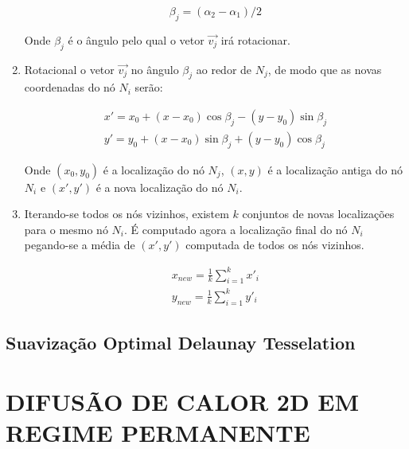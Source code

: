 \begin{enumerate}
    \begin{equation*}
        \beta_j = (\alpha_2 - \alpha_1) / 2
    \end{equation*}

    Onde $\beta_j$ é o ângulo pelo qual o vetor $\vec{v_j}$ irá rotacionar.

    \item Rotacional o vetor $\vec{v_j}$ no ângulo $\beta_j$ ao redor de $N_j$, de modo que as novas coordenadas do nó $N_i$ serão:
    
    \begin{equation*}
    \begin{split}
        x' = x_0 + (x-x_0) \cos{\beta_j} - (y-y_0) \sin{\beta_j}\\
        y' = y_0 + (x-x_0) \sin{\beta_j} + (y-y_0) \cos{\beta_j}
    \end{split}
    \end{equation*}

    Onde $(x_0, y_0)$ é a localização do nó $N_j$, $(x,y)$ é a localização antiga do nó $N_i$ e $(x', y')$ é a nova localização do nó $N_i$.

    \item Iterando-se todos os nós vizinhos, existem $k$ conjuntos de novas localizações para o mesmo nó $N_i$. É computado agora a localização final do nó $N_i$ pegando-se a média de $(x', y')$ computada de todos os nós vizinhos.
    
    \begin{equation*}
    \begin{split}
        x_{new} = \frac{1}{k} \sum_{i=1}^k x'_i\\
        y_{new} = \frac{1}{k} \sum_{i=1}^k y'_i
    \end{split}
    \end{equation*}
\end{enumerate}

\section{Suavização Optimal Delaunay Tesselation}

\cite{Chen2011}



\chapter[DIFUSÃO DE CALOR 2D EM REGIME PERMANENTE]{DIFUSÃO DE CALOR 2D EM REGIME PERMANENTE}

